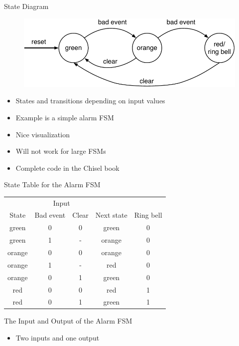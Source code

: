 \begin{frame}[fragile]{State Diagram}
\begin{figure}
  \includegraphics[scale=\scale]{../figures/state-diag-moore}
\end{figure}
\begin{itemize}
\item States and transitions depending on input values
\item Example is a simple alarm FSM
\item Nice visualization
\item Will not work for large FSMs
\item Complete code in the Chisel book
\end{itemize}
\end{frame}


\begin{frame}[fragile]{State Table for the Alarm FSM}
\begin{table}
\centering
\begin{tabular}{ccccc}
\toprule
& \multicolumn{2}{c}{Input} \\
\cmidrule{2-3}
State &  Bad event & Clear & Next state & Ring bell \\
\midrule
green & 0 & 0 & green & 0 \\
green & 1 & - & orange & 0 \\
orange & 0 & 0 & orange & 0 \\
orange & 1 & - & red & 0 \\
orange & 0 & 1 & green & 0 \\
red & 0 & 0 & red & 1 \\
red & 0 & 1 & green & 1 \\
\bottomrule
\end{tabular}
\label{tab:state:table}
\end{table}
\end{frame}

\begin{frame}[fragile]{The Input and Output of the Alarm FSM}
\begin{itemize}
\item Two inputs and one output
\end{itemize}
\end{frame}

